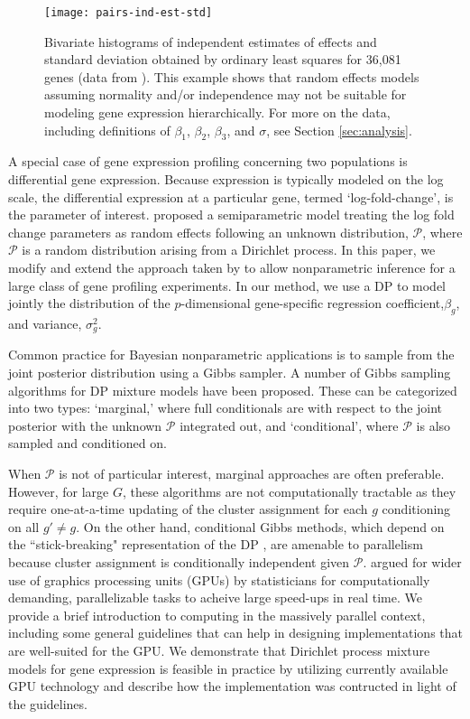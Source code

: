 \begin{figure}[ht]
\centering
\texttt{[image: pairs-ind-est-std]}
\caption{Bivariate histograms of independent estimates of effects and standard deviation obtained by ordinary least squares for 36,081 genes (data from \cite{paschold}). This example shows that random effects models assuming normality and/or independence may not be suitable for modeling gene expression hierarchically. For more on the data, including definitions of $\beta_1$, $\beta_2$, $\beta_3$, and $\sigma$, see Section \ref{sec:analysis}.}
\label{pairs-ind-est}
\end{figure}

A special case of gene expression profiling concerning two populations is differential gene expression. Because expression is typically modeled on the log scale, the differential expression at a particular gene, termed `log-fold-change', is the parameter of interest. \citet{liu} proposed a semiparametric model treating the log fold change parameters as random effects following an unknown distribution, $\mathcal{P}$, where $\mathcal{P}$ is a random distribution arising from a Dirichlet process. In this paper, we modify and extend the approach taken by \cite{liu} to allow nonparametric inference for a large class of gene profiling experiments. In our method, we use a DP to model jointly the distribution of the $p$-dimensional gene-specific regression coefficient,$\beta_g$, and variance, $\sigma^2_g$.

Common practice for Bayesian nonparametric applications is to sample from the joint posterior distribution using a Gibbs sampler. A number of Gibbs sampling algorithms for DP mixture models have been proposed. These can be categorized into two types: `marginal,' where full conditionals are with respect to the joint posterior with the unknown $\mathcal{P}$ integrated out, and `conditional', where $\mathcal{P}$ is also sampled and conditioned on.

When $\mathcal{P}$ is not of particular interest, marginal approaches are often preferable. However, for large $G$, these algorithms are not computationally tractable as they require one-at-a-time updating of the cluster assignment for each $g$ conditioning on all $g'\neq g$. On the other hand, conditional Gibbs methods, which depend on the ``stick-breaking" representation of the DP \citet{sethuraman}, are amenable to parallelism because cluster assignment is conditionally independent given $\mathcal{P}$. \citet{suchard} argued for wider use of graphics processing units (GPUs) by statisticians for computationally demanding, parallelizable tasks to acheive large speed-ups in real time. We provide a brief introduction to computing in the massively parallel context, including some general guidelines that can help in designing implementations that are well-suited for the GPU. We demonstrate that Dirichlet process mixture models for gene expression is feasible in practice by utilizing currently available GPU technology and describe how the implementation was contructed in light of the guidelines.

